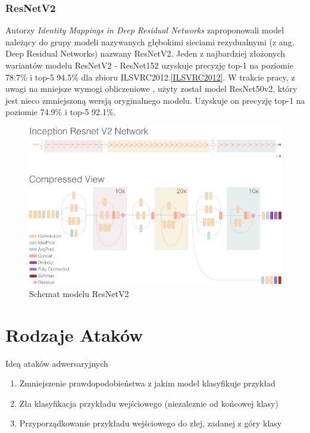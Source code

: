 \documentclass[
    left=2.5cm,         %
    right=2.5cm,        %
    top=2.5cm,          %
    bottom=3cm,         %
    bindingoffset=6mm,  %
    nohyphenation=false %
]{eiti/eiti-thesis}
\begin{document}
        \subsubsection{ResNetV2}
            Autorzy \textit{Identity Mappings in Deep Residual Networks}\cite{DBLP:journals/corr/HeZR016,}
            zaproponowali model należący do grupy modeli nazywanych głębokimi sieciami rezydualnymi (z ang. Deep Residual Networks)
            nazwany ResNetV2. Jeden z najbardziej złożonych wariantów modelu ResNetV2 - ResNet152
            uzyskuje precyzję top-1 na poziomie 78.7\% i top-5 94.5\% dla zbioru ILSVRC2012.\ref{ILSVRC2012}.
            W trakcie pracy, z uwagi na mniejsze wymogi obliczeniowe , użyty został model ResNet50v2, który jest
            nieco zmniejszoną wersją oryginalnego modelu. Uzyskuje on precyzję top-1 na poziomie 74.9\% i top-5 92.1\%.
            \begin{figure}[H]
            \centring
            \includegraphics[width=\textwidth]{eiti/resnetv2overview.png}
            \caption{Schemat modelu ResNetV2}
            \end{figure}






\section{Rodzaje Ataków}
Ideą ataków adwersaryjnych
\begin{enumerate}
    \item Zmniejszenie prawdopodobieństwa z jakim model klasyfikuje przykład
    \item Zła klasyfikacja przykładu wejściowego (niezaleznie od końcowej klasy)
    \item Przyporządkowanie przykładu wejściowego do złej, zadanej z góry klasy
\end{enumerate}
\end{document}
